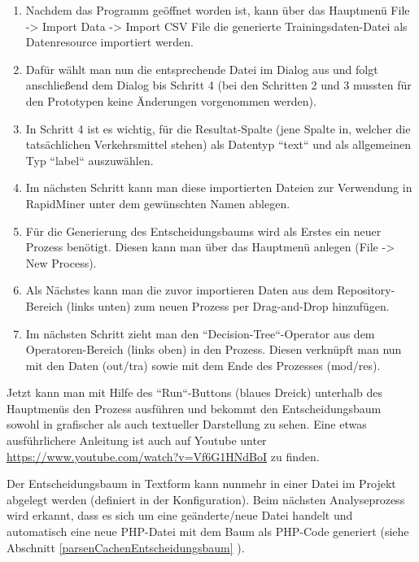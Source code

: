 \begin{enumerate}
\item Nachdem das Programm geöffnet worden ist, kann über das Hauptmenü File -> Import Data -> Import CSV File die generierte Trainingsdaten-Datei als Datenresource importiert werden. 
\item Dafür wählt man nun die entsprechende Datei im Dialog aus und folgt anschließend dem Dialog bis Schritt 4 (bei den Schritten 2 und 3 mussten für den Prototypen keine Änderungen vorgenommen werden). 
\item In Schritt 4 ist es wichtig, für die Resultat-Spalte (jene Spalte in, welcher die tatsächlichen Verkehrsmittel stehen) als Datentyp ``text`` und als allgemeinen Typ ``label`` auszuwählen. 
\item Im nächsten Schritt kann man diese importierten Dateien zur Verwendung in RapidMiner unter dem gewünschten Namen ablegen.
\item Für die Generierung des Entscheidungsbaums wird als Erstes ein neuer Prozess benötigt. Diesen kann man über das Hauptmenü anlegen (File -> New Process).
\item Als Nächstes kann man die zuvor importieren Daten aus dem Repository-Bereich (links unten) zum neuen Prozess per Drag-and-Drop hinzufügen. 
\item Im nächsten Schritt zieht man den ``Decision-Tree``-Operator aus dem Operatoren-Bereich (links oben) in den Prozess. Diesen verknüpft man nun mit den Daten (out/tra) sowie mit dem Ende des Prozesses (mod/res).
\end{enumerate}

Jetzt kann man mit Hilfe des ``Run``-Buttons (blaues Dreick) unterhalb des Hauptmenüs den Prozess ausführen und bekommt den Entscheidungsbaum sowohl in grafischer als auch textueller Darstellung zu sehen. Eine etwas ausführlichere Anleitung ist auch auf Youtube unter \url{https://www.youtube.com/watch?v=Vf6G1HNdBoI} zu finden.

Der Entscheidungsbaum in Textform kann nunmehr in einer Datei im Projekt abgelegt werden (definiert in der Konfiguration). Beim nächsten Analyseprozess wird erkannt, dass es sich um eine geänderte/neue Datei handelt und automatisch eine neue PHP-Datei mit dem Baum als PHP-Code  generiert (siehe Abschnitt \ref{parsenCachenEntscheidungsbaum} ).